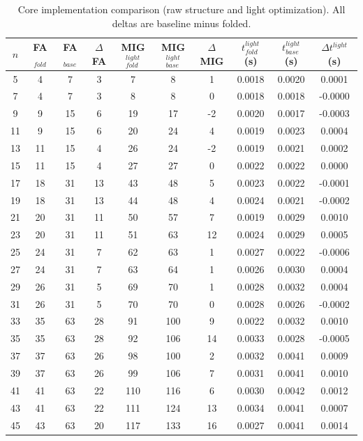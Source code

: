 \begin{table}[t]
\centering
\caption{Core implementation comparison (raw structure and light optimization). All deltas are baseline minus folded.}
\label{tab:core_impl}
\begin{tabular}{cccccccccc}
\hline
$n$ & FA$_{fold}$ & FA$_{base}$ & $\Delta$FA & MIG$_{fold}^{light}$ & MIG$_{base}^{light}$ & $\Delta$MIG & $t_{fold}^{light}$ (s) & $t_{base}^{light}$ (s) & $\Delta t^{light}$ (s) \\
\hline
5 & 4 & 7 & 3 & 7 & 8 & 1 & 0.0018 & 0.0020 & 0.0001 \\
7 & 4 & 7 & 3 & 8 & 8 & 0 & 0.0018 & 0.0018 & -0.0000 \\
9 & 9 & 15 & 6 & 19 & 17 & -2 & 0.0020 & 0.0017 & -0.0003 \\
11 & 9 & 15 & 6 & 20 & 24 & 4 & 0.0019 & 0.0023 & 0.0004 \\
13 & 11 & 15 & 4 & 26 & 24 & -2 & 0.0019 & 0.0021 & 0.0002 \\
15 & 11 & 15 & 4 & 27 & 27 & 0 & 0.0022 & 0.0022 & 0.0000 \\
17 & 18 & 31 & 13 & 43 & 48 & 5 & 0.0023 & 0.0022 & -0.0001 \\
19 & 18 & 31 & 13 & 44 & 48 & 4 & 0.0024 & 0.0021 & -0.0002 \\
21 & 20 & 31 & 11 & 50 & 57 & 7 & 0.0019 & 0.0029 & 0.0010 \\
23 & 20 & 31 & 11 & 51 & 63 & 12 & 0.0024 & 0.0029 & 0.0005 \\
25 & 24 & 31 & 7 & 62 & 63 & 1 & 0.0027 & 0.0022 & -0.0006 \\
27 & 24 & 31 & 7 & 63 & 64 & 1 & 0.0026 & 0.0030 & 0.0004 \\
29 & 26 & 31 & 5 & 69 & 70 & 1 & 0.0028 & 0.0032 & 0.0004 \\
31 & 26 & 31 & 5 & 70 & 70 & 0 & 0.0028 & 0.0026 & -0.0002 \\
33 & 35 & 63 & 28 & 91 & 100 & 9 & 0.0022 & 0.0032 & 0.0010 \\
35 & 35 & 63 & 28 & 92 & 106 & 14 & 0.0033 & 0.0028 & -0.0005 \\
37 & 37 & 63 & 26 & 98 & 100 & 2 & 0.0032 & 0.0041 & 0.0009 \\
39 & 37 & 63 & 26 & 99 & 106 & 7 & 0.0031 & 0.0041 & 0.0010 \\
41 & 41 & 63 & 22 & 110 & 116 & 6 & 0.0030 & 0.0042 & 0.0012 \\
43 & 41 & 63 & 22 & 111 & 124 & 13 & 0.0034 & 0.0041 & 0.0007 \\
45 & 43 & 63 & 20 & 117 & 133 & 16 & 0.0027 & 0.0041 & 0.0014 \\

\end{tabular}
\end{table}
